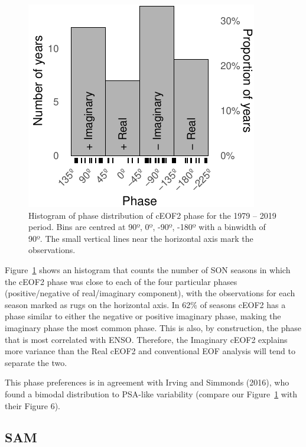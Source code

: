 \documentclass[smallextended]{svjour3}       %
\begin{document}
\begin{figure}
\centering
\includegraphics{../figures/phase-histogram-1.pdf}
\caption{\label{fig:phase-histogram}Histogram of phase distribution of cEOF2 phase for the 1979 -- 2019 period. Bins are centred at 90º, 0º, -90º, -180º with a binwidth of 90º. The small vertical lines near the horizontal axis mark the observations.}
\end{figure}

Figure~\ref{fig:phase-histogram} shows an histogram that counts the number of SON seasons in which the cEOF2 phase was close to each of the four particular phases (positive/negative of real/imaginary component), with the observations for each season marked as rugs on the horizontal axis.
In 62\% of seasons cEOF2 has a phase similar to either the negative or positive imaginary phase, making the imaginary phase the most common phase.
This is also, by construction, the phase that is most correlated with ENSO.
Therefore, the Imaginary cEOF2 explains more variance than the Real cEOF2 and conventional EOF analysis will tend to separate the two.

This phase preferences is in agreement with Irving and Simmonds (2016), who found a bimodal distribution to PSA-like variability (compare our Figure~\ref{fig:phase-histogram} with their Figure 6).

\hypertarget{sam}{%
\subsection{SAM}\label{sam}}
\end{document}
